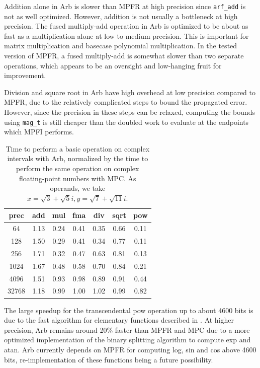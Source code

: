 \documentclass[10pt,journal,compsoc,cspaper]{IEEEtran}
\begin{document}
Addition alone in Arb is slower than MPFR at high precision since
\texttt{arf\_add} is not as well optimized. However, addition is
not usually a bottleneck at high precision.
The fused multiply-add operation in Arb is optimized to be about
as fast as a multiplication alone at low to medium precision.
This is important for matrix multiplication and
basecase polynomial multiplication.
In the tested version of MPFR, a fused multiply-add is somewhat slower than two separate
operations, which appears to be an oversight and low-hanging
fruit for improvement.

Division and square root in Arb have high overhead at low precision
compared to MPFR,
due to the relatively complicated steps to bound the propagated error.
However, since the precision in these steps can be relaxed,
computing the bounds using \texttt{mag\_t}
is still cheaper than the doubled work to evaluate
at the endpoints which MPFI performs.

\begin{table}[!ht]
\caption{Time to perform a basic operation on complex intervals with Arb,
normalized by the time to perform the same operation on complex
floating-point numbers with MPC.
As operands, we take $x = \sqrt{3}+\sqrt{5}i, y = \sqrt{7}+\sqrt{11}i$.}
\label{tab:timingscomplex}
\begin{center}
\renewcommand{\arraystretch}{1.2}
\begin{tabular}{c|c|c|c|c|c|c}
prec  &  add  &  mul & fma & div & sqrt & pow \\ \hline
64    &  1.13 &  0.24 & 0.41 & 0.35 & 0.66 & 0.11 \\
128   &  1.50 &  0.29 & 0.41 & 0.34 & 0.77 & 0.11 \\
256   &  1.71 &  0.32 & 0.47 & 0.63 & 0.81 & 0.13 \\
1024  &  1.67 &  0.48 & 0.58 & 0.70 & 0.84 & 0.21 \\
4096  &  1.51 &  0.93 & 0.98 & 0.89 & 0.91 & 0.44 \\
32768 &  1.18 &  0.99 & 1.00 & 1.02 & 0.99 & 0.82 \\
\end{tabular}%
\end{center}
\end{table}

The large speedup for the transcendental pow operation up to
about 4600 bits is due to the fast algorithm for
elementary functions described in \cite{Johansson2015elementary}.
At higher precision, Arb remains around 20\% faster than MPFR and MPC
due to a more optimized implementation of the
binary splitting algorithm to compute exp and atan.
Arb currently depends on MPFR for computing log, sin and cos above 4600 bits,
re-implementation of these functions being a future possibility.
\end{document}
